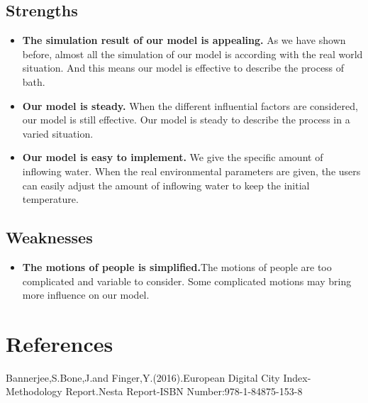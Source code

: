 \documentclass{mcmthesis}
\begin{document}
\subsection{Strengths}
\begin{itemize}
\item{\textbf{The simulation result of our model is appealing.} As we have shown before, almost all the simulation of our model is according with the real world situation. And this means our model is effective to describe the process of bath.}
\item{\textbf{Our model is steady.} When the different influential factors are considered, our model is still effective. Our model is steady to describe the process in a varied situation. }
\item{\textbf{Our model is easy to implement.} We give the specific amount of inflowing water. When the real environmental parameters are given, the users can easily adjust the amount of inflowing water to keep the initial temperature. }
\end{itemize}
\subsection{Weaknesses}
\begin{itemize}
\item{\textbf{The motions of people is simplified.}The motions of people are too complicated and variable to consider. Some complicated motions may bring more influence on our model. }
\end{itemize}


\section{References}
\begin{thebibliography}{99}
Bannerjee,S.Bone,J.and Finger,Y.(2016).European Digital City Index-Methodology Report.Nesta Report-ISBN Number:978-1-84875-153-8
\end{thebibliography}

\begin{appendices}
\end{appendices}
\end{document}
